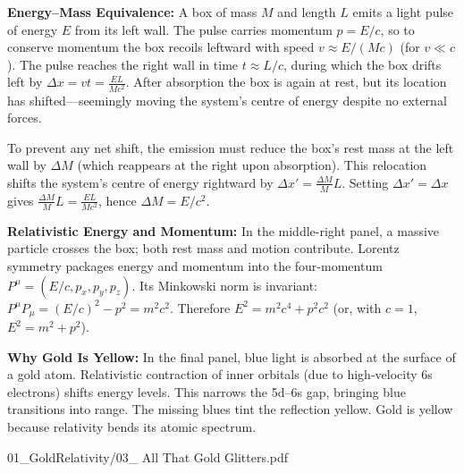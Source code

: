 \begin{SideNotePage}{
  \textbf{Energy–Mass Equivalence:} A box of mass \(M\) and length \(L\) emits a light pulse of energy \(E\) from its left wall. The pulse carries momentum \(p = E/c\), so to conserve momentum the box recoils leftward with speed \(v \approx E/(M c)\) (for \(v \ll c\)). The pulse reaches the right wall in time \(t \approx L/c\), during which the box drifts left by \(\Delta x = v t = \frac{E L}{M c^2}\). After absorption the box is again at rest, but its location has shifted—seemingly moving the system's centre of energy despite no external forces.

  To prevent any net shift, the emission must reduce the box's rest mass at the left wall by \(\Delta M\) (which reappears at the right upon absorption). This relocation shifts the system's centre of energy rightward by \(\Delta x' = \frac{\Delta M}{M} L\). Setting \(\Delta x' = \Delta x\) gives \(\frac{\Delta M}{M} L = \frac{E L}{M c^2}\), hence \(\Delta M = E/c^2\). \par

  \textbf{Relativistic Energy and Momentum:} In the middle-right panel, a massive particle crosses the box; both rest mass and motion contribute. Lorentz symmetry packages energy and momentum into the four‑momentum \(P^\mu = (E/c, p_x, p_y, p_z)\). Its Minkowski norm is invariant: \(P^\mu P_\mu = (E/c)^2 - p^2 = m^2 c^2\). Therefore \(E^2 = m^2 c^4 + p^2 c^2\) (or, with \(c=1\), \(E^2 = m^2 + p^2\)). \par

  \textbf{Why Gold Is Yellow:} In the final panel, blue light is absorbed at the surface of a gold atom. Relativistic contraction of inner orbitals (due to high-velocity 6s electrons) shifts energy levels. This narrows the 5d–6s gap, bringing blue transitions into range. The missing blues tint the reflection yellow. Gold is yellow because relativity bends its atomic spectrum. \par
}{01_GoldRelativity/03_ All That Gold Glitters.pdf}
\end{SideNotePage}
